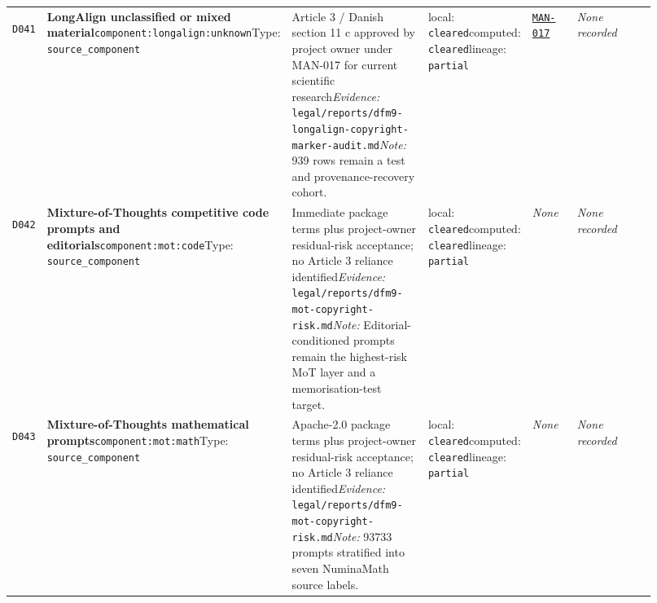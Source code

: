 \documentclass[9pt,a4paper]{article}
\newcommand{\depid}[1]{\hypertarget{dep:#1}{\texttt{#1}}}
\begin{document}
\begin{landscape}
\begin{longtable}{@{}L{0.035\linewidth}L{0.185\linewidth}L{0.27\linewidth}L{0.09\linewidth}L{0.10\linewidth}L{0.24\linewidth}@{}}
\depid{D041} & \textbf{LongAlign unclassified or mixed material}\newline \nolinkurl{component:longalign:unknown}\newline Type: \texttt{source\_component} & Article 3 / Danish section 11 c approved by project owner under MAN-017 for current scientific research\newline \textit{Evidence:} \nolinkurl{legal/reports/dfm9-longalign-copyright-marker-audit.md}\newline \textit{Note:} 939 rows remain a test and provenance-recovery cohort. & local: \texttt{cleared}\newline computed: \texttt{cleared}\newline lineage: \texttt{partial} & \hyperlink{manual:MAN-017}{\texttt{MAN-017}} & \textit{None recorded} \\
\depid{D042} & \textbf{Mixture-of-Thoughts competitive code prompts and editorials}\newline \nolinkurl{component:mot:code}\newline Type: \texttt{source\_component} & Immediate package terms plus project-owner residual-risk acceptance; no Article 3 reliance identified\newline \textit{Evidence:} \nolinkurl{legal/reports/dfm9-mot-copyright-risk.md}\newline \textit{Note:} Editorial-conditioned prompts remain the highest-risk MoT layer and a memorisation-test target. & local: \texttt{cleared}\newline computed: \texttt{cleared}\newline lineage: \texttt{partial} & \textit{None} & \textit{None recorded} \\
\depid{D043} & \textbf{Mixture-of-Thoughts mathematical prompts}\newline \nolinkurl{component:mot:math}\newline Type: \texttt{source\_component} & Apache-2.0 package terms plus project-owner residual-risk acceptance; no Article 3 reliance identified\newline \textit{Evidence:} \nolinkurl{legal/reports/dfm9-mot-copyright-risk.md}\newline \textit{Note:} 93733 prompts stratified into seven NuminaMath source labels. & local: \texttt{cleared}\newline computed: \texttt{cleared}\newline lineage: \texttt{partial} & \textit{None} & \textit{None recorded} \\

\end{longtable}
\end{landscape}
\end{document}

